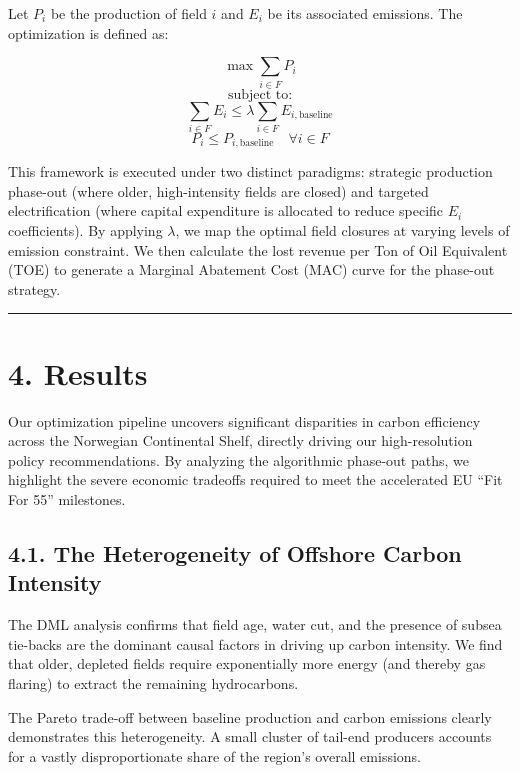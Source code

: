\documentclass[
  11pt,
]{article}
\begin{document}
Let \(P_i\) be the production of field \(i\) and \(E_i\) be its
associated emissions. The optimization is defined as:

\[ \max \sum_{i \in F} P_i \] \[ \text{subject to:} \]
\[ \sum_{i \in F} E_i \leq \lambda \sum_{i \in F} E_{i,\text{baseline}} \]
\[ P_i \leq P_{i,\text{baseline}} \quad \forall i \in F \]

This framework is executed under two distinct paradigms: strategic
production phase-out (where older, high-intensity fields are closed) and
targeted electrification (where capital expenditure is allocated to
reduce specific \(E_i\) coefficients). By applying \(\lambda\), we map
the optimal field closures at varying levels of emission constraint. We
then calculate the lost revenue per Ton of Oil Equivalent (TOE) to
generate a Marginal Abatement Cost (MAC) curve for the phase-out
strategy.

\begin{center}\rule{0.5\linewidth}{0.5pt}\end{center}

\section{4. Results}\label{results}

Our optimization pipeline uncovers significant disparities in carbon
efficiency across the Norwegian Continental Shelf, directly driving our
high-resolution policy recommendations. By analyzing the algorithmic
phase-out paths, we highlight the severe economic tradeoffs required to
meet the accelerated EU ``Fit For 55'' milestones.

\subsection{4.1. The Heterogeneity of Offshore Carbon
Intensity}\label{the-heterogeneity-of-offshore-carbon-intensity}

The DML analysis confirms that field age, water cut, and the presence of
subsea tie-backs are the dominant causal factors in driving up carbon
intensity. We find that older, depleted fields require exponentially
more energy (and thereby gas flaring) to extract the remaining
hydrocarbons.

The Pareto trade-off between baseline production and carbon emissions
clearly demonstrates this heterogeneity. A small cluster of tail-end
producers accounts for a vastly disproportionate share of the region's
overall emissions.
\end{document}
